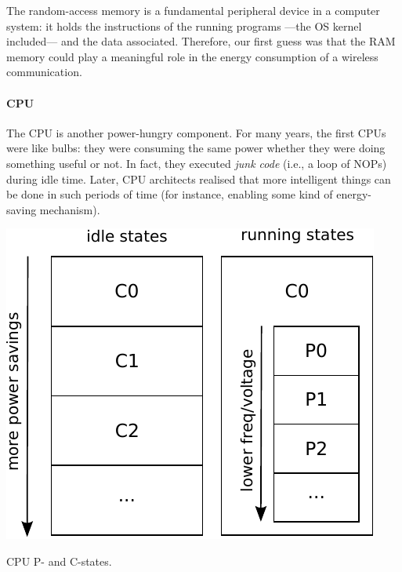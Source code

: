 \documentclass[twoside,nohyper]{tufte-book}
\theoremstyle{definition}
\theoremstyle{definition}
\theoremstyle{definition}
\theoremstyle{remark}
\begin{document}
The random-access memory is a fundamental peripheral device in a
computer system: it holds the instructions of the running programs
---the OS kernel included--- and the data associated. Therefore, our
first guess was that the RAM memory could play a meaningful role in the
energy consumption of a wireless communication.

\hypertarget{cpu}{%
\paragraph{CPU}\label{cpu}}

The CPU is another power-hungry component. For many years, the first
CPUs were like bulbs: they were consuming the same power whether they
were doing something useful or not. In fact, they executed \emph{junk
code} (i.e., a loop of NOPs) during idle time. Later, CPU architects
realised that more intelligent things can be done in such periods of
time (for instance, enabling some kind of energy-saving mechanism).



\begin{marginfigure}

{\centering \includegraphics[width=1\linewidth]{img/04/states} 

}

\caption[CPU P- and C-states.]{CPU P- and C-states.}\label{fig:states}
\end{marginfigure}
\end{document}
